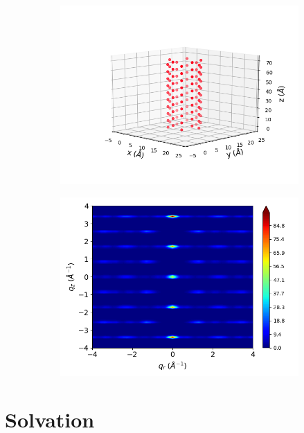 \documentclass[journal=jpcbfk,manusciprt=article]{achemso}
\begin{document}
\begin{figure}[!htb]
\begin{subfigure}{0.45\textwidth}
  \includegraphics[width=\textwidth]{simple_offset_realspace.png}
  \caption{}\label{fig:simple_offset_realspace}
  \end{subfigure}
  \begin{subfigure}{0.45\textwidth}
  \includegraphics[width=\textwidth]{simple_offset_rzplot.png}
  \caption{}\label{fig:simple_offset_rzplot}
  \end{subfigure}
  \caption{}\label{fig:simple_FTs}
  \end{figure}
  
  \section{Solvation}\label{section:solvation}
  
\end{document}
